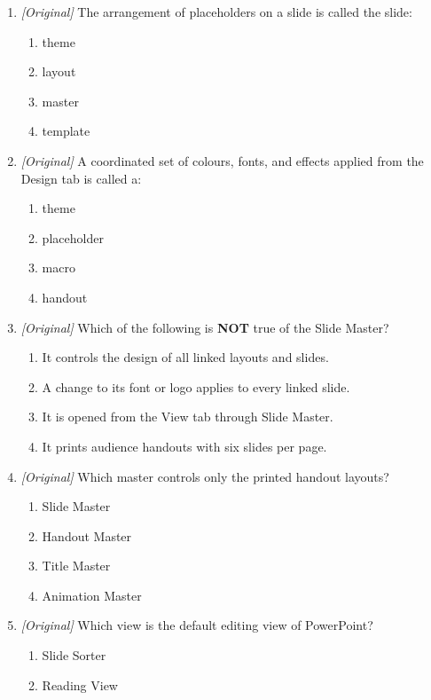 \documentclass[11pt]{article}
\begin{document}
\begin{enumerate}[label=\textbf{Q\arabic*.}, leftmargin=*]
\begin{enumerate}[label=\Alph*.]
  \end{enumerate}
\item \textit{[Original]} The arrangement of placeholders on a slide is
  called the slide:
  \begin{enumerate}[label=\Alph*.]
    \item theme
    \item layout
    \item master
    \item template
  \end{enumerate}
\item \textit{[Original]} A coordinated set of colours, fonts, and effects
  applied from the Design tab is called a:
  \begin{enumerate}[label=\Alph*.]
    \item theme
    \item placeholder
    \item macro
    \item handout
  \end{enumerate}
\item \textit{[Original]} Which of the following is \textbf{NOT} true of the
  Slide Master?
  \begin{enumerate}[label=\Alph*.]
    \item It controls the design of all linked layouts and slides.
    \item A change to its font or logo applies to every linked slide.
    \item It is opened from the View tab through Slide Master.
    \item It prints audience handouts with six slides per page.
  \end{enumerate}
\item \textit{[Original]} Which master controls only the printed handout
  layouts?
  \begin{enumerate}[label=\Alph*.]
    \item Slide Master
    \item Handout Master
    \item Title Master
    \item Animation Master
  \end{enumerate}
\item \textit{[Original]} Which view is the default editing view of
  PowerPoint?
  \begin{enumerate}[label=\Alph*.]
    \item Slide Sorter
    \item Reading View

\end{enumerate}
\end{enumerate}
\end{document}
